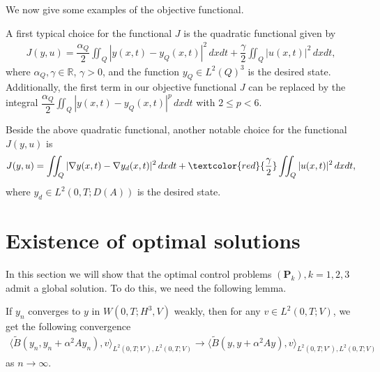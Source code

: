\documentclass[reqno]{amsart}
\begin{document}
	We now give some examples of the objective functional.
	\begin{example}{\rm 
			A first typical choice for the functional $J$ is the quadratic functional given by 
			\begin{align}
				J(y,u) = \dfrac{\alpha_Q}{2}\iint_Q |y(x,t) - y_Q(x,t)|^2 \,dxdt \nonumber +\dfrac{\gamma}{2} \iint_Q |u(x,t)|^2\,dxdt,  \label{2.46}
			\end{align}
			where $\alpha_Q,\gamma \in \mathbb{R}$, $\gamma>0$, and the function $y_Q \in L^2(Q)^3$ is the desired state. \\
			Additionally, the first term in our objective functional $J$ can be replaced by the integral $\displaystyle \dfrac{\alpha_Q}{2}\iint_Q |y(x,t) - y_Q(x,t)|^p\,dxdt $ with $2\leq p <6$.
		}
	\end{example}
	
	\begin{example}{\rm 
			Beside the above quadratic functional,  another notable choice for the functional $J(y,u)$ is
			\begin{equation*}
				J(y,u)= \iint_Q |\nabla y(x,t) - \nabla y_d(x,t)|^2 \,dxdt + \textcolor{red}{\dfrac{\gamma}{2}} \iint_Q |u(x,t)|^2\,dxdt,
			\end{equation*}
			where $y_d \in L^2(0,T;D(A))$ is the desired state. }
	\end{example}
	
	\section{Existence of optimal solutions}
	
	In this section we will show that the optimal control problems $(\textbf{P}_k), k=1,2,3$ admit a global solution. To do this,  we need the following lemma.
	\begin{lemma} \label{lem3.1}
		If ${y_n}$ converges to $y$ in $W(0,T;H^3,V)$ weakly, then for any $v \in L^2(0,T;V)$, we get the following convergence
		\begin{align*}
			\langle \widetilde{B}(y_n, y_n+\alpha^2 Ay_n),v \rangle _{L^2(0,T;V'),L^2(0,T;V)} \rightarrow \langle \widetilde{B}(y,y+\alpha^2Ay),v \rangle _{L^2(0,T;V'),L^2(0,T;V)}
		\end{align*} as $n \rightarrow \infty$.
	\end{lemma}
	
\end{document}
